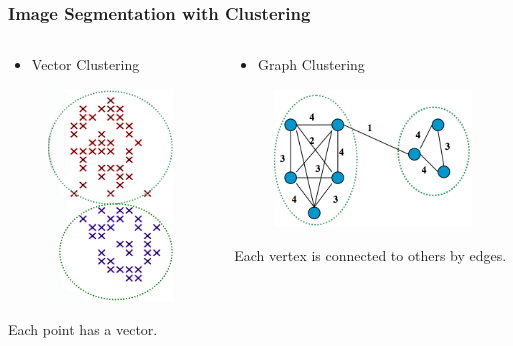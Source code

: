 \documentclass[notheorems,serif,table,compress]{beamer}  %
\begin{document}
 \begin{frame}
\frametitle{Image Segmentation with Clustering}
    \begin{columns}
        \begin{column}{0.5\linewidth}
          \begin{itemize}
          \item Vector Clustering
          \end{itemize}
          \begin{figure}
          \includegraphics[width=0.3\linewidth]{vc.png} 
          \end{figure}
          Each point has a vector.
        \end{column}
        \begin{column}{0.45\linewidth}
          \begin{itemize}
          \item Graph Clustering
          \end{itemize}
          \begin{figure}
          \includegraphics[width=0.7\linewidth]{gc.png} 
          \end{figure}
          Each vertex is connected to others by edges.
        \end{column}
    \end{columns}\vspace{1ex}
\end{frame}
 
\end{document}
